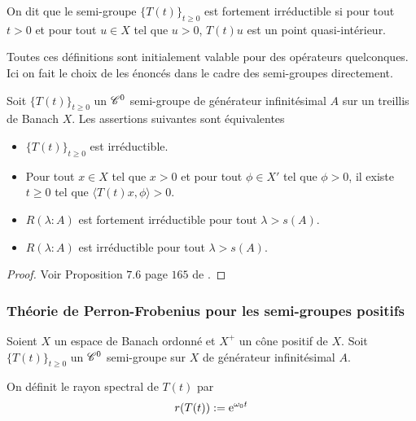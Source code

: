 \begin{definition}\label{def_fort_irreductible}
    On dit que le semi-groupe $\big\{T(t)\big\}_{t \geq 0}$ est fortement irréductible si pour tout $t > 0$ et pour tout $u \in X$ tel que $u>0$, $T(t)u$ est un point quasi-intérieur.
\end{definition}

\begin{remark}
    Toutes ces définitions sont initialement valable pour des opérateurs quelconques. Ici on fait le choix de les énoncés dans le cadre des semi-groupes directement.
\end{remark}

\begin{proposition}\label{SG_irréductible}
    Soit $\big\{T(t)\big\}_{t \geq 0}$ un $\mathscr{C}^0$ semi-groupe de générateur infinitésimal $A$ sur un treillis de Banach $X$. Les assertions suivantes sont équivalentes
    \begin{itemize}
        \item[$(i)$] $\big\{T(t)\big\}_{t \geq 0}$ est irréductible.
        \item[$(ii)$] Pour tout $x \in X$ tel que $x>0$ et pour tout $\phi \in X'$ tel que $\phi>0$, il existe $t \geq 0$ tel que $\langle T(t)x,\phi\rangle >0$.
        \item[$(iii)$] $R(\lambda : A)$ est fortement irréductible pour tout $\lambda > s(A)$.
        \item[$(iv)$] $R(\lambda : A)$ est irréductible pour tout $\lambda >s(A)$.   
    \end{itemize}
\end{proposition}

\begin{proof}
    Voir Proposition $7.6$ page $165$ de \cite{Clement1987}.
\end{proof}

\subsubsection{Théorie de Perron-Frobenius pour les semi-groupes positifs}
Soient $X$ un espace de Banach ordonné et $X^+$ un cône positif de $X$. Soit $\big\{T(t)\big\}_{t \geq 0}$ un $\mathscr{C}^0$ semi-groupe sur $X$ de générateur infinitésimal $A$.

\begin{definition}
    On définit le \textcolor{astral}{rayon spectral} de $T(t)$ par 
    \begin{equation*}
        r(T(t)) := \mathrm{e}^{\omega_0t}
    \end{equation*}
\end{definition}

